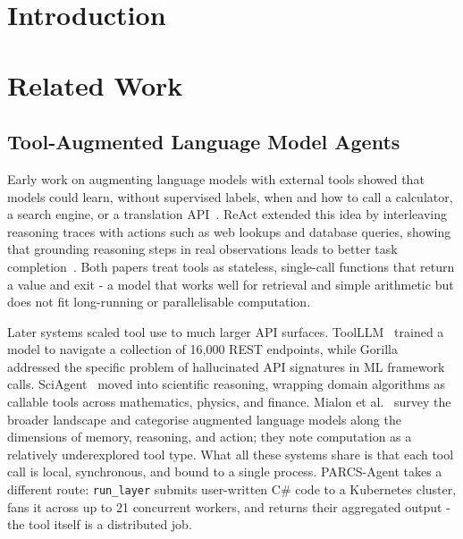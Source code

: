 \documentclass[preprints,article,submit,pdftex,moreauthors]{Definitions/mdpi}
\begin{document}
\section{Introduction}

\section{Related Work}
\label{sec:related}

\subsection{Tool-Augmented Language Model Agents}

Early work on augmenting language models with external tools showed that models could learn, without supervised labels, when and how to call a calculator, a search engine, or a translation API~\citep{ref-toolformer}. ReAct extended this idea by interleaving reasoning traces with actions such as web lookups and database queries, showing that grounding reasoning steps in real observations leads to better task completion~\citep{ref-react}. Both papers treat tools as stateless, single-call functions that return a value and exit - a model that works well for retrieval and simple arithmetic but does not fit long-running or parallelisable computation.

Later systems scaled tool use to much larger API surfaces. ToolLLM~\citep{ref-toolllm} trained a model to navigate a collection of 16{,}000 REST endpoints, while Gorilla~\citep{ref-gorilla} addressed the specific problem of hallucinated API signatures in ML framework calls. SciAgent~\citep{ref-sciagent} moved into scientific reasoning, wrapping domain algorithms as callable tools across mathematics, physics, and finance. Mialon et al.~\citep{ref-augmented-survey} survey the broader landscape and categorise augmented language models along the dimensions of memory, reasoning, and action; they note computation as a relatively underexplored tool type. What all these systems share is that each tool call is local, synchronous, and bound to a single process. PARCS-Agent takes a different route: \texttt{run\_layer} submits user-written C\# code to a Kubernetes cluster, fans it across up to 21 concurrent workers, and returns their aggregated output - the tool itself is a distributed job.
\end{document}
